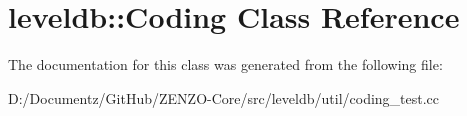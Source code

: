 \hypertarget{classleveldb_1_1_coding}{}\section{leveldb\+::Coding Class Reference}
\label{classleveldb_1_1_coding}


The documentation for this class was generated from the following file\+:\begin{DoxyCompactItemize}
\item 
D\+:/\+Documentz/\+Git\+Hub/\+Z\+E\+N\+Z\+O-\/\+Core/src/leveldb/util/coding\+\_\+test.\+cc\end{DoxyCompactItemize}
